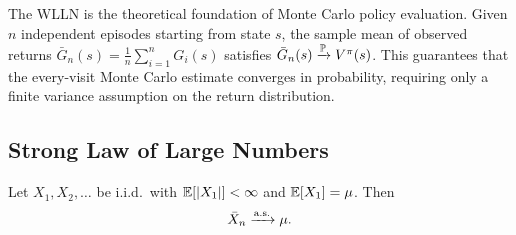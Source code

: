 \documentclass[11pt,a4paper]{article}
\begin{document}
\begin{rlconnection}[title={WLLN and Monte Carlo Estimation}]
The WLLN is the theoretical foundation of Monte Carlo policy
evaluation.  Given $n$ independent episodes starting from state
$s$, the sample mean of observed returns
$\bar{G}_n(s) = \frac{1}{n}\sum_{i=1}^n G_i(s)$ satisfies
$\bar{G}_n(s) \xrightarrow{\mathbb{P}} V^\pi(s)$.  This guarantees that the
every-visit Monte Carlo estimate converges in probability,
requiring only a finite variance assumption on the return
distribution.
\end{rlconnection}

\subsection{Strong Law of Large Numbers}
\label{subsec:slln}

\begin{keyresult}[title={Strong Law of Large Numbers}]
\begin{theorem}
\label{thm:slln}
Let $X_1, X_2, \ldots$ be i.i.d.\ with
$\mathbb{E}[|X_1|] < \infty$ and $\mathbb{E}[X_1] = \mu$.  Then
\begin{equation}
  \bar{X}_n \xrightarrow{\text{a.s.}} \mu.
  \label{eq:slln}
\end{equation}
\end{theorem}
\end{keyresult}
\end{document}
